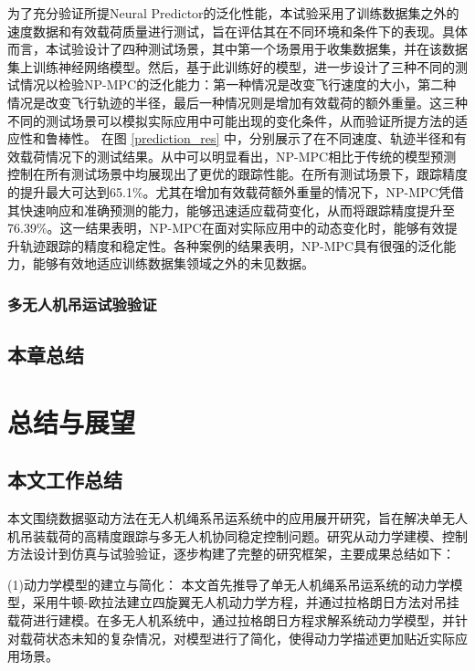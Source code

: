 \documentclass[lang=chs, degree=master, blindreview=false, winfonts=true]{yanputhesis}
\begin{document}
为了充分验证所提Neural Predictor的泛化性能，本试验采用了训练数据集之外的速度数据和有效载荷质量进行测试，旨在评估其在不同环境和条件下的表现。具体而言，本试验设计了四种测试场景，其中第一个场景用于收集数据集，并在该数据集上训练神经网络模型。然后，基于此训练好的模型，进一步设计了三种不同的测试情况以检验NP-MPC的泛化能力：第一种情况是改变飞行速度的大小，第二种情况是改变飞行轨迹的半径，最后一种情况则是增加有效载荷的额外重量。这三种不同的测试场景可以模拟实际应用中可能出现的变化条件，从而验证所提方法的适应性和鲁棒性。
在图 \ref{prediction_res} 中，分别展示了在不同速度、轨迹半径和有效载荷情况下的测试结果。从中可以明显看出，NP-MPC相比于传统的模型预测控制在所有测试场景中均展现出了更优的跟踪性能。在所有测试场景下，跟踪精度的提升最大可达到65.1\%。尤其在增加有效载荷额外重量的情况下，NP-MPC凭借其快速响应和准确预测的能力，能够迅速适应载荷变化，从而将跟踪精度提升至76.39\%。这一结果表明，NP-MPC在面对实际应用中的动态变化时，能够有效提升轨迹跟踪的精度和稳定性。各种案例的结果表明，NP-MPC具有很强的泛化能力，能够有效地适应训练数据集领域之外的未见数据。

\subsection{多无人机吊运试验验证}

\section{本章总结}


\cleardoublepage

\chapter{总结与展望}


\section{本文工作总结}
本文围绕数据驱动方法在无人机绳系吊运系统中的应用展开研究，旨在解决单无人机吊装载荷的高精度跟踪与多无人机协同稳定控制问题。研究从动力学建模、控制方法设计到仿真与试验验证，逐步构建了完整的研究框架，主要成果总结如下：

(1)动力学模型的建立与简化：
本文首先推导了单无人机绳系吊运系统的动力学模型，采用牛顿-欧拉法建立四旋翼无人机动力学方程，并通过拉格朗日方法对吊挂载荷进行建模。在多无人机系统中，通过拉格朗日方程求解系统动力学模型，并针对载荷状态未知的复杂情况，对模型进行了简化，使得动力学描述更加贴近实际应用场景。
\end{document}
